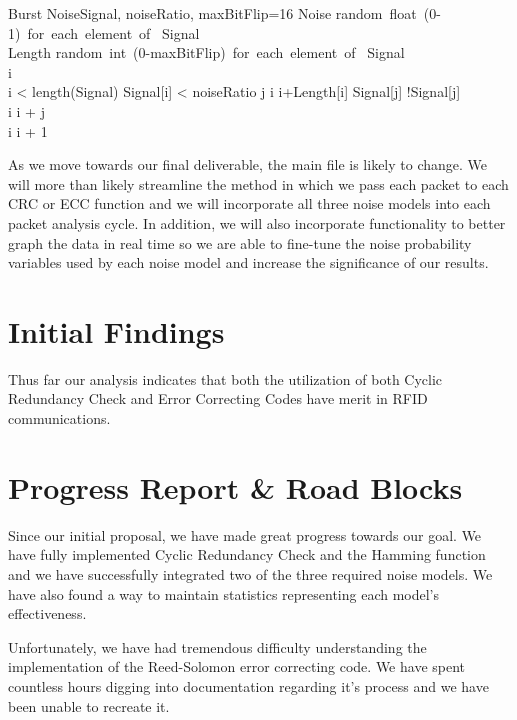 \documentclass{sigcomm-alternate}
\begin{document}
\begin{pseudocode}{Burst Noise}{Signal, noiseRatio, maxBitFlip=16}
	Noise \GETS \mbox{random float (0-1) for each element of } Signal\\
	Length \GETS \mbox{random int (0-maxBitFlip) for each element of } Signal\\
	i \\	
	\WHILE i < length(Signal) \DO
		\BEGIN
			\IF Signal[i] < noiseRatio
			\THEN
				\BEGIN
					\FOR j \GETS i \TO i+Length[i] \DO
						\BEGIN
							Signal[j] \GETS !Signal[j]
						\END\\
					i \GETS i + j\\
				\END
			\ELSE
				i \GETS i + 1
		\END\\
\end{pseudocode}

As we move towards our final deliverable, the main file is likely to change. We will more than likely streamline the method in which we pass each packet to each CRC or ECC function and we will incorporate all three noise models into each packet analysis cycle. In addition, we will also incorporate functionality to better graph the data in real time so we are able to fine-tune the noise probability variables used by each noise model and increase the significance of our results.

\section{Initial Findings}
Thus far our analysis indicates that both the utilization of both Cyclic Redundancy Check and Error Correcting Codes have merit in RFID communications. 

\section{Progress Report \& Road Blocks}
Since our initial proposal, we have made great progress towards our goal. We have fully implemented Cyclic Redundancy Check and the Hamming function and we have successfully integrated two of the three required noise models. We have also found a way to maintain statistics representing each model's effectiveness.

Unfortunately, we have had tremendous difficulty understanding the implementation of the Reed-Solomon error correcting code. We have spent countless hours digging into documentation regarding it's process and we have been unable to recreate it.
\end{document}
